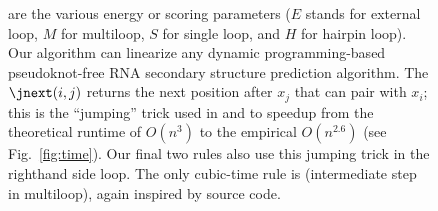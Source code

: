 \begin{figure}
{  are the various energy or scoring parameters ($E$ stands for external loop, $M$ for multiloop, $S$ for single loop, and $H$ for hairpin loop).
  Our \linearfold algorithm can linearize any dynamic programming-based pseudoknot-free RNA secondary structure prediction algorithm.
  The $\jnext(i, j)$ returns the next position after $x_j$ that can pair with $x_i$;
  this is the ``jumping'' trick used in \contrafold and \viennarna to speedup from the theoretical runtime of $O(n^3)$ to
  the empirical  $O(n^{2.6})$
  (see Fig.~\ref{fig:time}). Our final two rules also use this jumping trick in the righthand side loop.
  The only cubic-time rule is \nreduce (intermediate step in multiloop), again inspired by \contrafold source code.
    \label{fig:realdeduct}}
\end{figure}%


